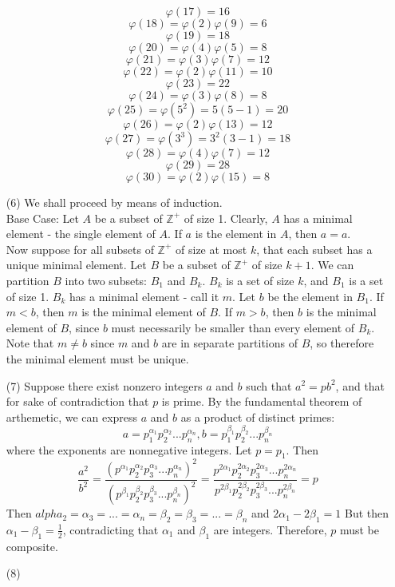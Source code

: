 \documentclass[12pt]{article}
\begin{document}
\begin{itemize}
$$\varphi(17) = 16$$
$$\varphi(18) = \varphi(2)\varphi(9) = 6$$
$$\varphi(19) = 18$$
$$\varphi(20) = \varphi(4)\varphi(5) = 8$$
$$\varphi(21) = \varphi(3)\varphi(7) = 12$$
$$\varphi(22) = \varphi(2)\varphi(11) = 10$$
$$\varphi(23) = 22$$
$$\varphi(24) = \varphi(3)\varphi(8) = 8$$
$$\varphi(25) = \varphi(5^2) = 5(5 - 1) = 20$$
$$\varphi(26) = \varphi(2)\varphi(13) = 12$$
$$\varphi(27) = \varphi(3^3) = 3^2(3 - 1) = 18$$
$$\varphi(28) = \varphi(4)\varphi(7) = 12$$
$$\varphi(29) = 28$$
$$\varphi(30) = \varphi(2)\varphi(15) = 8$$
\item[(6)] We shall proceed by means of induction. \\
Base Case: Let $A$ be a subset of $\mathbb{Z}^+$ of size 1. Clearly, $A$ has a minimal element - the single element of $A$. If $a$ is the element in $A$, then $a = a$. \\
Now suppose for all subsets of $\mathbb{Z}^+$ of size at most $k$, that each subset has a unique minimal element. Let $B$ be a subset of $\mathbb{Z}^+$ of size $k + 1$. We can partition $B$ into two subsets: $B_1$ and $B_k$. $B_k$ is a set of size $k$, and $B_1$ is a set of size 1. $B_k$ has a minimal element - call it $m$. Let $b$ be the element in $B_1$. If $m < b$, then $m$ is the minimal element of $B$. If $m > b$, then $b$ is the minimal element of $B$, since $b$ must necessarily be smaller than every element of $B_k$. Note that $m \neq b$ since $m$ and $b$ are in separate partitions of $B$, so therefore the minimal element must be unique.
\item[(7)] Suppose there exist nonzero integers $a$ and $b$ such that $a^2 = pb^2$, and that for sake of contradiction that $p$ is prime. By the fundamental theorem of arthemetic, we can express $a$ and $b$ as a product of distinct primes:
$$a = p_1^{\alpha_1}p_2^{\alpha_2}...p_n^{\alpha_n}, b = p_1^{\beta_1}p_2^{\beta_2}...p_n^{\beta_n}$$
where the exponents are nonnegative integers. Let $p = p_1$. Then
$$\frac{a^2}{b^2} = \frac{\left(p^{\alpha_1}p_2^{\alpha_2}p_3^{\alpha_3}...p_n^{\alpha_n} \right)^2}{\left(p^{\beta_1}p_2^{\beta_2}p_3^{\beta_3}...p_n^{\beta_n} \right)^2} = \frac{p^{2\alpha_1}p_2^{2\alpha_2}p_3^{2\alpha_3}...p_n^{2\alpha_n}}{p^{2\beta_1}p_2^{2\beta_2}p_3^{2\beta_3}...p_n^{2\beta_n}} = p$$
Then $alpha_2 = \alpha_3 = ... = \alpha_n = \beta_2 = \beta_3 = ... = \beta_n$ and $2\alpha_1 - 2\beta_1 = 1$ But then $\alpha_1 - \beta_1 = \frac{1}{2}$, contradicting that $\alpha_1$ and $\beta_1$ are integers. Therefore, $p$ must be composite.
\item[(8)]

\end{itemize}
\end{document}
